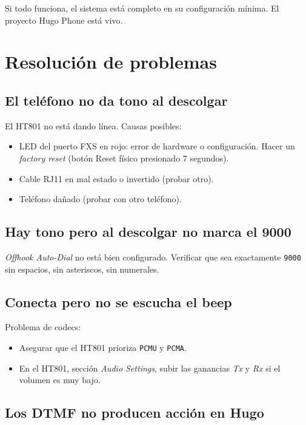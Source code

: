 Si todo funciona, el sistema está completo en su configuración mínima. El proyecto Hugo Phone está vivo.

\section{Resolución de problemas}

\subsection{El teléfono no da tono al descolgar}

El HT801 no está dando línea. Causas posibles:

\begin{itemize}
  \item LED del puerto FXS en rojo: error de hardware o configuración. Hacer un \emph{factory reset} (botón Reset físico presionado 7 segundos).
  \item Cable RJ11 en mal estado o invertido (probar otro).
  \item Teléfono dañado (probar con otro teléfono).
\end{itemize}

\subsection{Hay tono pero al descolgar no marca el 9000}

\emph{Offhook Auto-Dial} no está bien configurado. Verificar que sea exactamente \texttt{9000} sin espacios, sin asteriscos, sin numerales.

\subsection{Conecta pero no se escucha el beep}

Problema de codecs:

\begin{itemize}
  \item Asegurar que el HT801 prioriza \texttt{PCMU} y \texttt{PCMA}.
  \item En el HT801, sección \emph{Audio Settings}, subir las ganancias \emph{Tx} y \emph{Rx} si el volumen es muy bajo.
\end{itemize}

\subsection{Los DTMF no producen acción en Hugo}

